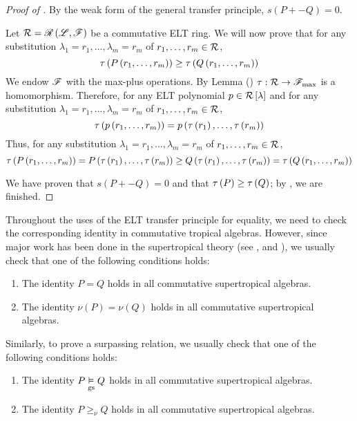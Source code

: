 \begin{proof}[Proof of ]
By the weak form of the general transfer principle, $s\left(P+\minus Q\right)=0$.

Let $\mathcal{R}=\mathscr{R}\left(\mathscr{L},\mathscr{F}\right)$ be a commutative ELT ring. We will now prove that for any substitution $\lambda_1=r_1,\dots,\lambda_m=r_m$ of $r_1,\dots,r_m\in\mathcal{R}$,
$$\tau\left(P\left(r_1,\dots,r_m\right)\right)\ge\tau\left(Q\left(r_1,\dots,r_m\right)\right)$$
We endow $\mathscr{F}$ with the max-plus operations. By Lemma () $\tau:\mathcal{R}\to\mathscr{F}_{\max}$ is a homomorphism. Therefore, for any ELT polynomial $p\in\mathcal{R}\left[\lambda\right]$ and for any substitution $\lambda_1=r_1,\dots,\lambda_m=r_m$ of $r_1,\dots,r_m\in\mathcal{R}$,
$$\tau\left(p\left(r_1,\dots,r_m\right)\right)=p\left(\tau\left(r_1\right),\dots,\tau\left(r_m\right)\right)$$
Thus, for any substitution $\lambda_1=r_1,\dots,\lambda_m=r_m$ of $r_1,\dots,r_m\in\mathcal{R}$,
$$\tau\left(P\left(r_1,\dots,r_m\right)\right)=P\left(\tau\left(r_1\right),\dots,\tau\left(r_m\right)\right)\ge Q\left(\tau\left(r_1\right),\dots,\tau\left(r_m\right)\right)=\tau\left(Q\left(r_1,\dots,r_m\right)\right)$$

We have proven that $s\left(P+\minus Q\right)=0$ and that $\tau\left(P\right)\ge\tau\left(Q\right)$; by , we are finished.
\end{proof}

\begin{rem}
Throughout the uses of the ELT transfer principle for equality, we need to check the corresponding identity in commutative tropical algebras. However, since major work has been done in the supertropical theory (see \cite{IR3}, \cite{Izhaki2009} and \cite{Izhaki2010b}), we usually check that one of the following conditions holds:
\begin{enumerate}
\item The identity $P=Q$ holds in all commutative supertropical algebras.
\item The identity $\nu\left(P\right)=\nu\left(Q\right)$ holds in all commutative supertropical algebras.
\end{enumerate}
Similarly, to prove a surpassing relation, we usually check that one of the following conditions holds:
\begin{enumerate}
\item The identity $P\underset{\text{gs}}{\vDash} Q$ holds in all commutative supertropical algebras.
\item The identity $P\ge_\nu Q$ holds in all commutative supertropical algebras.
\end{enumerate}
\end{rem}

